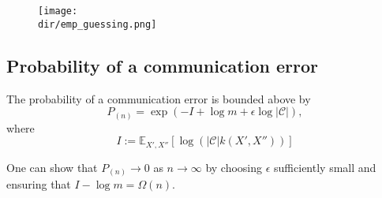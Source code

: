 \begin{figure}
\texttt{[image: \\dir/emp\_guessing.png]}
\caption{}
\label{fig:emp_guessing}
\end{figure}

\subsection{Probability of a communication error}
\label{sub:prob_comm_error}

\begin{theorem}
The probability of a communication error is bounded above by 
%
\begin{equation}
P_{(n)} = \exp\left(- I + \log m + \epsilon \log\left|\mathcal{C}\right|\right),
\label{eq:prob_comm_error_empirical_var}
\end{equation}
%
where
%
\begin{equation}
I := \mathbb{E}_{X', X''}\left[\log \left(\left|\mathcal{C}\right|k(X', X'')\right)\right]
\label{eq:exp_log_pa}
\end{equation}
%
\label{thm:comm_error_emp_var}
\end{theorem}

One can show that $P_{(n)} \to 0$ as $n \to \infty$ by choosing $\epsilon$ sufficiently small and ensuring that $I - \log m = \Omega(n)$.

